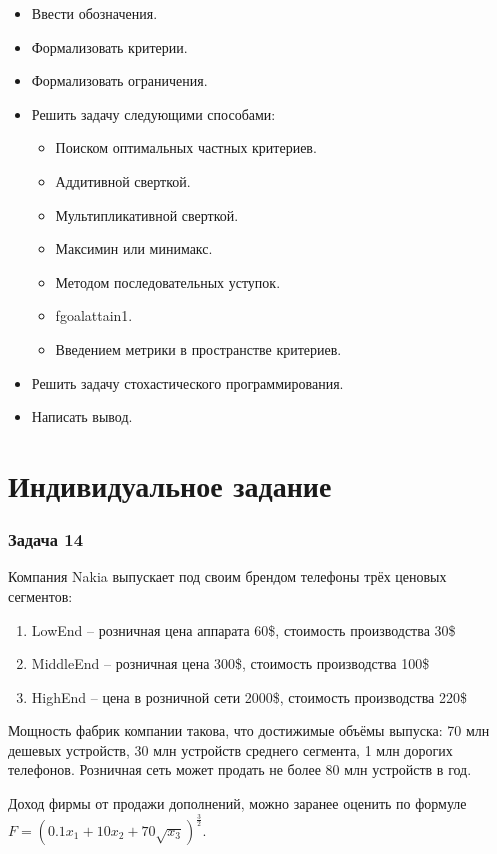 \documentclass[14pt,a4paper,report]{report}
\begin{document}
\begin{itemize}
	\item Ввести обозначения.
	\item Формализовать критерии.
	\item Формализовать ограничения.
	\item Решить задачу следующими способами:
	\begin{itemize}
		\item Поиском оптимальных частных критериев.
		\item Аддитивной сверткой.
		\item Мультипликативной сверткой.
		\item Максимин или минимакс.
		\item Методом последовательных уступок.
		\item fgoalattain1.
		\item Введением метрики в пространстве критериев.
	\end{itemize}
	\item Решить задачу стохастического программирования.
	\item Написать вывод.
\end{itemize}

\section{Индивидуальное задание}

\subsubsection{Задача 14}

Компания Nakia выпускает под своим брендом телефоны трёх ценовых сегментов:

\begin{enumerate}
	\item LowEnd – розничная цена аппарата 60\$, стоимость производства 30\$
	\item MiddleEnd – розничная цена 300\$, стоимость производства 100\$
	\item HighEnd – цена в розничной сети 2000\$, стоимость производства 220\$
\end{enumerate}

Мощность фабрик компании такова, что достижимые объёмы выпуска: 70 млн дешевых устройств, 30 млн устройств среднего сегмента, 1 млн дорогих телефонов. Розничная сеть может продать не более 80 млн устройств в год.

Доход фирмы от продажи дополнений, можно заранее оценить по формуле $F=(0.1x_1+10x_2+70\sqrt{x_3})^{\frac{3}{2}}$.
\end{document}
